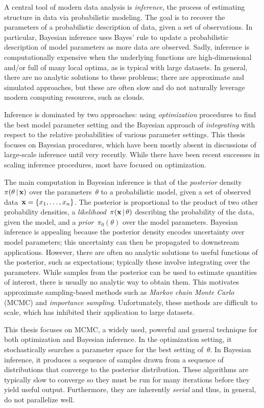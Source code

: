 \documentclass[angelino.tex]{subfiles}
\begin{document}
A central tool of modern data analysis is \emph{inference},
the process of estimating structure in data via probabilistic modeling.
The goal is to recover the parameters of a probabilistic
description of data, given a set of observations.
In particular, Bayesian inference uses Bayes' rule to update
a probabilistic description of model parameters as more data are observed.
Sadly, inference is computationally expensive when the underlying functions are
high-dimensional and/or full of many local optima,
as is typical with large datasets.
In general, there are no analytic solutions to these problems;
there are approximate and simulated approaches, but these are often
slow and do not naturally leverage modern computing resources, such as clouds.

Inference is dominated by two approaches:
using \emph{optimization} procedures to find the best model parameter setting 
and the Bayesian approach of \emph{integrating} with respect to the
relative probabilities of various parameter settings.
This thesis focuses on Bayesian procedures, which have been mostly absent
in discussions of large-scale inference until very recently.
While there have been recent successes in scaling inference procedures,
most have focused on optimization.

The main computation in Bayesian inference is that of the
\emph{posterior} density~$\pi(\theta \,|\, \mathbf{x})$
over the parameters~$\theta$ to a probabilistic model,
given a set of observed data~$\mathbf{x} = \{x_1, \dots, x_n\}$.
The posterior is proportional to the product of two other probability densities,
a \emph{likelihood}~$\pi(\mathbf{x} \,|\, \theta)$ describing the probability
of the data, given the model,
and a \emph{prior}~$\pi_0(\theta)$ over the model parameters.
Bayesian inference is appealing because the posterior density
encodes uncertainty over model parameters;
this uncertainty can then be propagated to downstream applications.
However, there are often no analytic solutions to
useful functions of the posterior, such as expectations;
typically these involve integrating over the parameters.
While samples from the posterior can be used to estimate quantities of 
interest, there is usually no analytic way to obtain them.
This motivates approximate sampling-based methods such as
\emph{Markov chain Monte Carlo} (MCMC) and \emph{importance sampling}.
Unfortunately, these methods are difficult to scale,
which has inhibited their application to large datasets.

This thesis focuses on MCMC, a widely used, powerful and general technique
for both optimization and Bayesian inference.
In the optimization setting, it stochastically searches a parameter space for
the best setting of~$\theta$.
In Bayesian inference, it produces a sequence of samples drawn from a
sequence of distributions that converge to the posterior distribution.
These algorithms are typically slow to converge so they must be run for many 
iterations before they yield useful output.
Furthermore, they are inherently \emph{serial} and
thus, in general, do not parallelize well.
\end{document}
